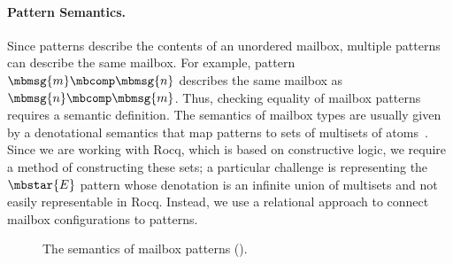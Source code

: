 \paragraph{Pattern Semantics.}
Since patterns describe the contents of an unordered mailbox, multiple patterns can describe the same mailbox.
For example, pattern $\mbmsg{m} \mbcomp \mbmsg{n}$ describes the same mailbox as $\mbmsg{n} \mbcomp \mbmsg{m}$.
Thus, checking equality of mailbox patterns requires a semantic definition.
The semantics of mailbox types are usually given by a denotational semantics
that map patterns to sets of multisets of atoms~\cite{deliguoroMailboxTypesUnordered2018}.
Since we are working with Rocq, which is based on constructive logic, we require
a method of constructing these sets;
a particular challenge is representing the $\mbstar{E}$ pattern whose denotation
is an infinite union of multisets and not easily representable in Rocq.
Instead, we use a relational approach to connect mailbox configurations to
patterns. 

\begin{figure}[t]
  \begin{center}
        \begin{prooftree}
        \end{prooftree}
        \quad
        \begin{prooftree}
        \end{prooftree}
        \quad
        \begin{prooftree}
        \end{prooftree}
        \quad
        \begin{prooftree}
        \end{prooftree}
        \quad
        \begin{prooftree}
        \end{prooftree}
        \quad
        \begin{prooftree}
        \end{prooftree}
    \end{center}

    \caption{The semantics of mailbox patterns ().}
    \label{fig:pattern-semantics}
\end{figure}

